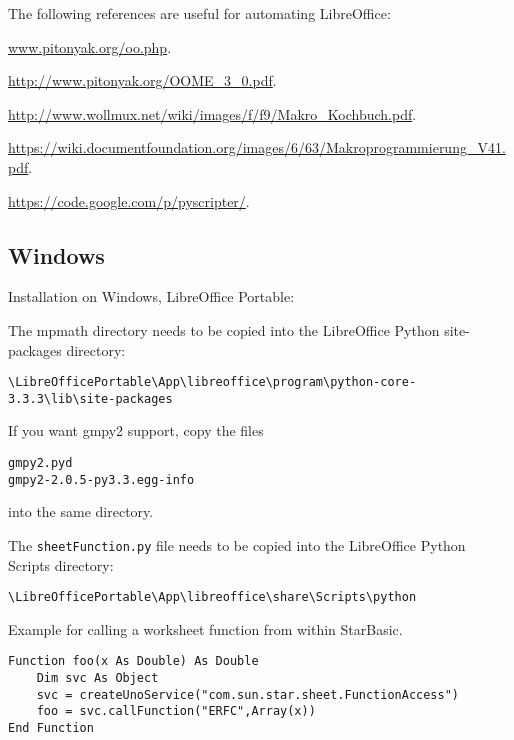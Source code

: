 The following references are useful for automating LibreOffice:

\vpara
\href{www.pitonyak.org/oo.php}{www.pitonyak.org/oo.php}. 

\vpara
\href{http://www.pitonyak.org/OOME\_3\_0.pdf}{http://www.pitonyak.org/OOME\_3\_0.pdf}. 

\vpara
\href{http://www.wollmux.net/wiki/images/f/f9/Makro\_Kochbuch.pdf}{http://www.wollmux.net/wiki/images/f/f9/Makro\_Kochbuch.pdf}. 

\vpara
\href{https://wiki.documentfoundation.org/images/6/63/Makroprogrammierung\_V41.pdf}{https://wiki.documentfoundation.org/images/6/63/Makroprogrammierung\_V41.pdf}. 


\vpara
\href{https://code.google.com/p/pyscripter/}{https://code.google.com/p/pyscripter/}. 










\subsection{Windows}
Installation on Windows, LibreOffice Portable:

The mpmath directory needs to be copied into the LibreOffice Python site-packages directory:
\begin{verbatim}
\LibreOfficePortable\App\libreoffice\program\python-core-3.3.3\lib\site-packages
\end{verbatim}
If you want gmpy2 support, copy the files 
\begin{verbatim}
gmpy2.pyd
gmpy2-2.0.5-py3.3.egg-info
\end{verbatim}
into the same directory.
	
The \verb|sheetFunction.py| file needs to be copied into the  LibreOffice Python Scripts directory:
\begin{verbatim}
\LibreOfficePortable\App\libreoffice\share\Scripts\python
\end{verbatim}


Example for calling a worksheet function from within StarBasic.

\begin{lstlisting}
Function foo(x As Double) As Double
	Dim svc As Object
	svc = createUnoService("com.sun.star.sheet.FunctionAccess")
	foo = svc.callFunction("ERFC",Array(x))
End Function
\end{lstlisting}



